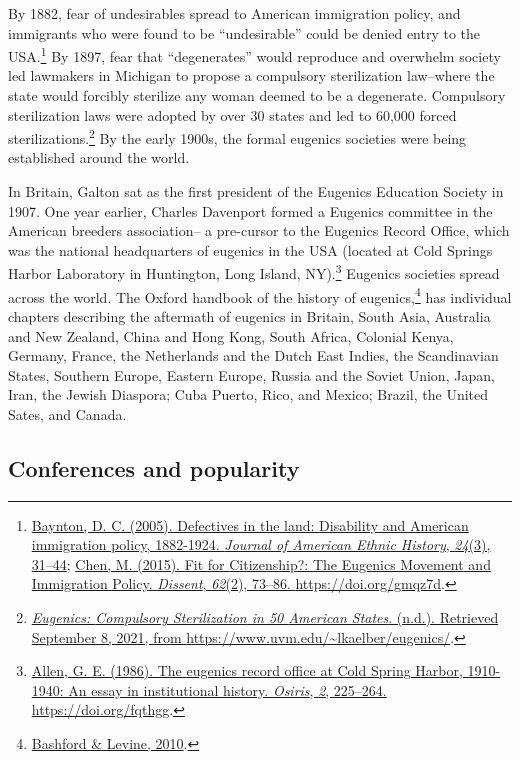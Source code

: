 \documentclass[
  oneside,
  12pt]{crumpbook}
\begin{document}
By 1882, fear of undesirables spread to American immigration policy, and immigrants who were found to be ``undesirable'' could be denied entry to the USA.\footnote{\protect\hyperlink{ref-bayntonDefectivesLandDisability2005}{Baynton, D. C. (2005). Defectives in the land: {Disability} and {American} immigration policy, 1882-1924. \emph{Journal of American Ethnic History}, \emph{24}(3), 31--44}; \protect\hyperlink{ref-chenFitCitizenshipEugenics2015}{Chen, M. (2015). Fit for {Citizenship}?: {The Eugenics Movement} and {Immigration Policy}. \emph{Dissent}, \emph{62}(2), 73--86. \url{https://doi.org/gmqz7d}}.} By 1897, fear that ``degenerates'' would reproduce and overwhelm society led lawmakers in Michigan to propose a compulsory sterilization law--where the state would forcibly sterilize any woman deemed to be a degenerate. Compulsory sterilization laws were adopted by over 30 states and led to 60,000 forced sterilizations.\footnote{\protect\hyperlink{ref-EugenicsCompulsorySterilization}{\emph{Eugenics: {Compulsory Sterilization} in 50 {American States}}. (n.d.). Retrieved September 8, 2021, from \url{https://www.uvm.edu/~lkaelber/eugenics/}}.} By the early 1900s, the formal eugenics societies were being established around the world.

In Britain, Galton sat as the first president of the Eugenics Education Society in 1907. One year earlier, Charles Davenport formed a Eugenics committee in the American breeders association-- a pre-cursor to the Eugenics Record Office, which was the national headquarters of eugenics in the USA (located at Cold Springs Harbor Laboratory in Huntington, Long Island, NY).\footnote{\protect\hyperlink{ref-allenEugenicsRecordOffice1986}{Allen, G. E. (1986). The eugenics record office at {Cold Spring Harbor}, 1910-1940: An essay in institutional history. \emph{Osiris}, \emph{2}, 225--264. \url{https://doi.org/fqthgg}}.} Eugenics societies spread across the world. The Oxford handbook of the history of eugenics,\footnote{\protect\hyperlink{ref-bashfordOxfordHandbookHistory2010}{Bashford \& Levine, 2010}.} has individual chapters describing the aftermath of eugenics in Britain, South Asia, Australia and New Zealand, China and Hong Kong, South Africa, Colonial Kenya, Germany, France, the Netherlands and the Dutch East Indies, the Scandinavian States, Southern Europe, Eastern Europe, Russia and the Soviet Union, Japan, Iran, the Jewish Diaspora; Cuba Puerto, Rico, and Mexico; Brazil, the United Sates, and Canada.

\hypertarget{conferences-and-popularity}{%
\subsection{Conferences and popularity}\label{conferences-and-popularity}}
\end{document}
